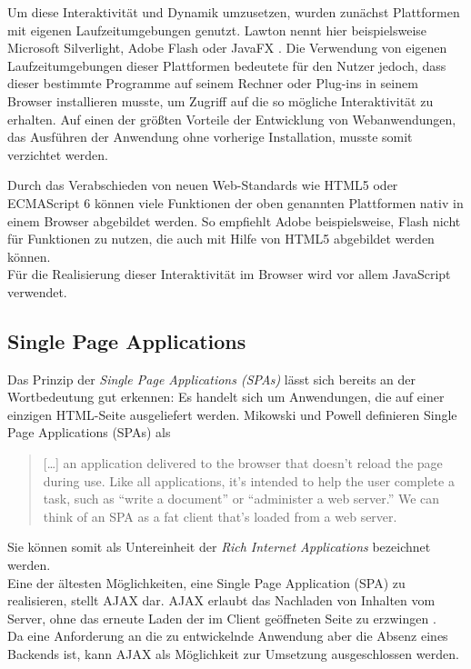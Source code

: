 Um diese Interaktivität und Dynamik umzusetzen, wurden zunächst Plattformen mit eigenen Laufzeitumgebungen genutzt. Lawton nennt hier beispielsweise Microsoft Silverlight, Adobe Flash oder JavaFX  \cite{lawton2008new}.
Die Verwendung von eigenen Laufzeitumgebungen dieser Plattformen  bedeutete für den Nutzer jedoch,  dass dieser bestimmte Programme auf seinem Rechner oder Plug-ins in seinem Browser installieren musste, um Zugriff auf die so mögliche Interaktivität zu erhalten. Auf einen der größten Vorteile der Entwicklung von Webanwendungen, das Ausführen der Anwendung ohne vorherige Installation, musste somit verzichtet werden.

Durch das Verabschieden von neuen Web-Standards wie HTML5 oder ECMAScript 6 können viele Funktionen der oben genannten Plattformen nativ in einem Browser abgebildet werden. So empfiehlt Adobe beispielsweise, Flash nicht für Funktionen zu nutzen, die auch mit Hilfe von HTML5 abgebildet werden können\footnotemark{}.\\
Für die Realisierung dieser Interaktivität im Browser wird vor allem JavaScript verwendet.


\subsection{Single Page Applications}
Das Prinzip der \textit{Single Page Applications (SPAs)} lässt sich bereits an der Wortbedeutung gut erkennen: Es handelt sich um Anwendungen, die auf einer einzigen HTML-Seite ausgeliefert werden.
Mikowski und Powell definieren Single Page Applications (SPAs) als

\begin{quote}
  […] an application delivered to the browser that doesn’t reload the page during use. Like all applications, it’s intended to help the user complete a task, such as “write a document” or “administer a web server.” We can think of an SPA as a fat client that’s loaded from a web server. \cite{MikowskiPowell201309}
\end{quote}

Sie können somit als Untereinheit der \textit{Rich Internet Applications} bezeichnet werden.\\
Eine der ältesten Möglichkeiten, eine Single Page Application (SPA) zu realisieren, stellt AJAX dar. AJAX erlaubt das Nachladen von Inhalten vom Server, ohne das erneute Laden der im Client geöffneten Seite zu erzwingen \cite{paulson2005building}.\\
Da eine Anforderung an die zu entwickelnde Anwendung aber die Absenz eines Backends ist, kann AJAX als Möglichkeit zur Umsetzung ausgeschlossen werden.

